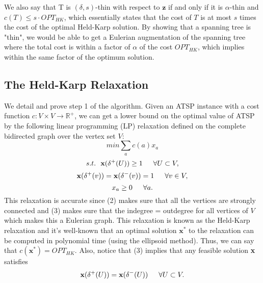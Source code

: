 \documentclass[oneside]{projectpaper} %
\begin{document}
\indent We also say that T is $(\delta, s)$-thin with respect to $\textbf{z}$ if and only if it is $\alpha$-thin and $c(T) \leq s \cdot OPT_{HK}$, which essentially states that the cost of $T$ is at most $s$ times the cost of the optimal Held-Karp solution.
\indent By showing that a spanning tree is "thin", we would be able to get a Eulerian augmentation of the spanning tree where the total cost is within a factor of $\alpha$ of the cost $OPT_{HK}$, which implies within the same factor of the optimum solution.

\subsection{The Held-Karp Relaxation}
We detail and prove step 1 of the algorithm. Given an ATSP instance with a cost function $c : V \times V \rightarrow \mathbb{R}^+$, we can get a lower bound on the optimal value of ATSP by the following linear programming (LP) relaxation defined on the complete bidirected graph over the vertex set $V$:
\begin{equation}
  min \sum\limits_{a}c(a)x_a
\end{equation}
\begin{equation}
  s.t. \ \ \textbf{x}(\delta^{+}(U)) \geq 1 \indent \forall U \subset V,
\end{equation}
\begin{equation}
  \textbf{x}(\delta^{+}(v)) = \textbf{x}(\delta^{-}(v)) = 1 \indent \forall v \in V,
\end{equation}
\begin{equation*}
  x_a \geq 0 \indent \forall a.
\end{equation*}
This relaxation is accurate since (2) makes sure that all the vertices are strongly connected and (3) makes sure that the indegree = outdegree for all vertices of $V$ which makes this a Eulerian graph. This relaxation is known as the Held-Karp relaxation \cite{HK70} and it's well-known that an optimal solution $\textbf{x}^*$ to the relaxation can be computed in polynomial time (using the ellipsoid method). Thus, we can say that $c(\textbf{x}^*) = OPT_{HK}$. Also, notice that (3) implies that any feasible solution \textbf{x} satisfies
\begin{equation}
  \textbf{x}(\delta^{+}(U)) =   \textbf{x}(\delta^{-}(U)) \indent \forall U \subset V.
\end{equation}

\end{document}
